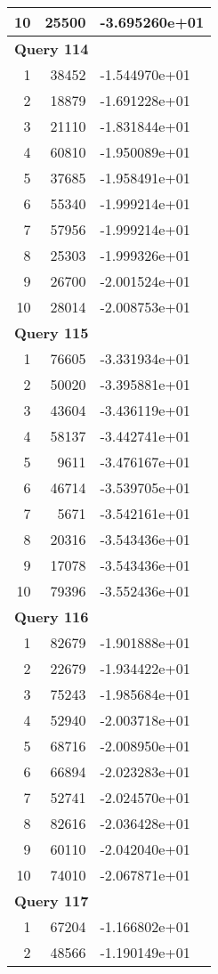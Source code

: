 \begin{longtable}[{p}]{@{}rrp{}@{}}
10 & 25500 & -3.695260e+01 \\
\midrule
\multicolumn{3}{l}{\bfseries Query 114} \\
1 & 38452 & -1.544970e+01 \\
2 & 18879 & -1.691228e+01 \\
3 & 21110 & -1.831844e+01 \\
4 & 60810 & -1.950089e+01 \\
5 & 37685 & -1.958491e+01 \\
6 & 55340 & -1.999214e+01 \\
7 & 57956 & -1.999214e+01 \\
8 & 25303 & -1.999326e+01 \\
9 & 26700 & -2.001524e+01 \\
10 & 28014 & -2.008753e+01 \\
\midrule
\multicolumn{3}{l}{\bfseries Query 115} \\
1 & 76605 & -3.331934e+01 \\
2 & 50020 & -3.395881e+01 \\
3 & 43604 & -3.436119e+01 \\
4 & 58137 & -3.442741e+01 \\
5 & 9611 & -3.476167e+01 \\
6 & 46714 & -3.539705e+01 \\
7 & 5671 & -3.542161e+01 \\
8 & 20316 & -3.543436e+01 \\
9 & 17078 & -3.543436e+01 \\
10 & 79396 & -3.552436e+01 \\
\midrule
\multicolumn{3}{l}{\bfseries Query 116} \\
1 & 82679 & -1.901888e+01 \\
2 & 22679 & -1.934422e+01 \\
3 & 75243 & -1.985684e+01 \\
4 & 52940 & -2.003718e+01 \\
5 & 68716 & -2.008950e+01 \\
6 & 66894 & -2.023283e+01 \\
7 & 52741 & -2.024570e+01 \\
8 & 82616 & -2.036428e+01 \\
9 & 60110 & -2.042040e+01 \\
10 & 74010 & -2.067871e+01 \\
\midrule
\multicolumn{3}{l}{\bfseries Query 117} \\
1 & 67204 & -1.166802e+01 \\
2 & 48566 & -1.190149e+01 \\

\end{longtable}
